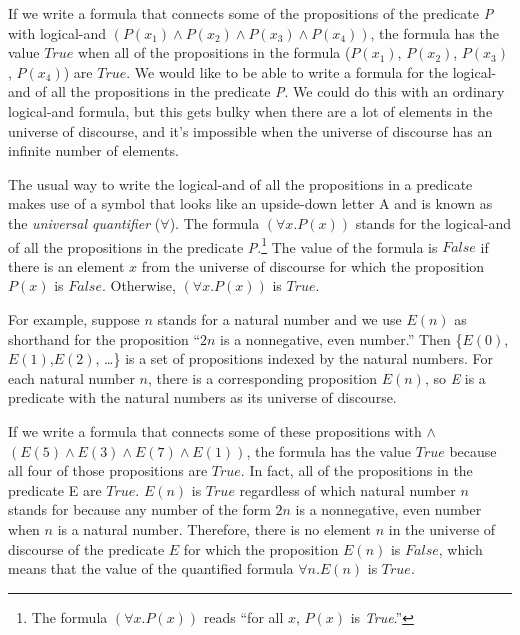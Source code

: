 {{If we write a formula that connects some of the propositions
of the predicate \emph{P} with logical-and
$(P(x_1) \wedge P(x_2) \wedge P(x_3) \wedge P(x_4))$,
the formula has the value $True$
when all of the propositions in the formula ($P(x_1)$, $P(x_2)$, $P(x_3)$, $P(x_4)$)
are $True$.
We would like to be able to write a formula
for the logical-and of all the propositions in the predicate \emph{P}.
We could do this with an ordinary logical-and formula,
but this gets bulky when there are a lot of elements
in the universe of discourse,
and it's impossible when the universe of discourse
has an infinite number of elements.

The usual way to write the logical-and of all the propositions in a predicate
makes use of a symbol that looks like an upside-down letter A
and is known as the
\label{def:universal-quantifier}\emph{universal quantifier} ($\forall$).
The  formula $(\forall x.P(x))$
stands for the logical-and of all the propositions in the predicate
\emph{P}.\footnote{The
formula $(\forall x. P(x))$ reads ``for all $x$, $P(x)$ is \emph{True}.''}
The value of the formula is $False$
if there is an element $x$ from the universe of discourse
for which the proposition $P(x)$ is $False$.
Otherwise, $(\forall x.P(x))$ is $True$.

For example, suppose $n$ stands for a natural number
and we use
$E(n)$ as shorthand for the proposition ``$2n$ is a nonnegative, even number.''
Then \{$E(0)$, $E(1)$,$E(2)$, \dots\}
is a set of propositions indexed by the natural numbers.
For each natural number $n$, there is a corresponding proposition $E(n)$,
so \emph{E} is a predicate with the natural numbers
as its universe of discourse.

If we write a formula that connects some of these propositions with $\wedge$
$(E(5) \wedge E(3) \wedge E(7) \wedge E(1))$,
the formula has the value $True$
because all four of those propositions are $True$.
In fact, all of the propositions in the predicate E are $True$.
$E(n)$ is $True$ regardless of which natural number $n$ stands for
because any number of the form $2n$ is a nonnegative, even number
when $n$ is a natural number.
Therefore, there is no element $n$ in the universe of discourse of
the predicate $E$ for which the proposition $E(n)$ is $False$,
which means that the value of the quantified formula $\forall n.E(n)$
is $True$.

}}
